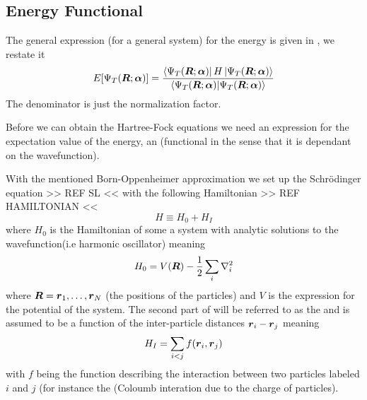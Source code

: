     \subsection{Energy Functional}
        The general expression (for a general system) for the energy is given
        in , we restate it
            \begin{equation}
                E[{\Psi}_T(\boldsymbol{{R}};\boldsymbol{{\alpha}})] = \frac{\bra{{\Psi}_T(\boldsymbol{{R}};\boldsymbol{{\alpha}})}H\ket{{\Psi}_T(\boldsymbol{{R}};\boldsymbol{{\alpha}})}}{\braket{{\Psi}_T(\boldsymbol{{R}};\boldsymbol{{\alpha}})}}
                \label{eq:energyFunc}
            \end{equation}
        The denominator is just the normalization factor.

        Before we can obtain the Hartree-Fock equations we need an expression
        for the expectation value of the energy, an 
        (functional in the sense that it is dependant on the wavefunction).

        With the mentioned Born-Oppenheimer approximation we set up the
        Schrödinger equation >> REF SL << with the following Hamiltonian >> REF
        HAMILTONIAN <<
            \begin{equation}
                H \equiv H_0 + H_I
                \label{eq:hamiltoninandef}
            \end{equation}
        where $H_0$ is the Hamiltonian of some a system with analytic solutions
        to the wavefunction(i.e harmonic oscillator) meaning
            \begin{equation}
                H_0 = V(\boldsymbol{{R}}) - \frac{1}{2}\sum_i\nabla^2_i
            \end{equation}
        where $\boldsymbol{{R}}=\boldsymbol{{r}}_1,\dots,\boldsymbol{{r}}_N$ (the positions of the
        particles) and $V$ is the expression for the potential of the system.
        The second part of  will be referred to as the
         and is assumed to be a function of the
        inter-particle distances $\boldsymbol{{r}}_i-\boldsymbol{{r}}_j$ meaning
            \begin{equation}
                H_I = \sum\limits_{i<j} f(\boldsymbol{{r}}_i, \boldsymbol{{r}}_j)
            \end{equation}
        with $f$ being the function describing the interaction between two
        particles labeled $i$ and $j$ (for instance the (Coloumb interation due
        to the charge of particles).

